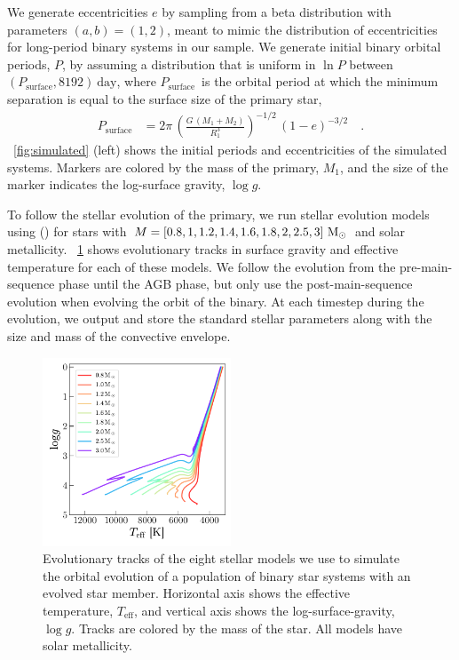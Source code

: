 \documentclass[modern, letterpaper]{aastex62}
\newcommand{\logg}{\ensuremath{\log g}}
\newcommand{\Psurf}{\ensuremath{P_\textrm{surface}}}
\begin{document}
We generate eccentricities $e$ by sampling from a beta distribution with
parameters $(a, b) = (1, 2)$, meant to mimic the distribution of eccentricities
for long-period binary systems in our sample.
We generate initial binary orbital periods, $P$, by assuming a distribution that
is uniform in $\ln P$ between $(\Psurf, 8192)~\textrm{day}$, where
\Psurf\ is the orbital period at which the minimum separation is
equal to the surface size of the primary star,
\begin{align}
    \Psurf &= 2\pi \,
        \left(\frac{G \, (M_1+M_2)}{R_1^3}\right)^{-1/2} \,
        \left(1-e\right)^{-3/2}
    \quad . \label{eq:Psurf}
\end{align}
\figurename~\ref{fig:simulated} (left) shows the initial periods and
eccentricities of the simulated systems.
Markers are colored by the mass of the primary, $M_1$, and the size of the
marker indicates the log-surface gravity, \logg.

To follow the stellar evolution of the primary, we run stellar evolution models
using  (\citealt{Paxton:2011}) for stars with $M = [0.8, 1, 1.2,
1.4, 1.6, 1.8, 2, 2.5, 3]~\mathrm{M}_\odot$ and solar metallicity.
\figurename~\ref{fig:mesa} shows evolutionary tracks in surface gravity and
effective temperature for each of these models.
We follow the evolution from the pre-main-sequence phase until the AGB phase,
but only use the post-main-sequence evolution when evolving the orbit of the
binary.
At each timestep during the evolution, we output and store the standard stellar
parameters along with the size and mass of the convective envelope.

\begin{figure}[h]
\begin{center}
\includegraphics[width=0.5\textwidth]{mesa}
\end{center}
\caption{%
Evolutionary tracks of the eight stellar models we use to simulate the orbital
evolution of a population of binary star systems with an evolved star member.
Horizontal axis shows the effective temperature, $T_\textrm{eff}$, and vertical
axis shows the log-surface-gravity, \logg.
Tracks are colored by the mass of the star.
All models have solar metallicity.
\label{fig:mesa}
}
\end{figure}
\end{document}
